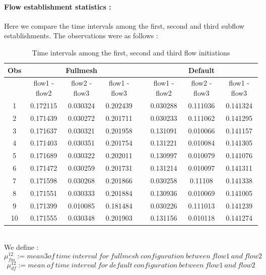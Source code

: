 \documentclass[a4paper,11pt]{article}
\begin{document}
			\clearpage
			\paragraph{Flow establishment statistics :}
			\label{subsubsubsec:flowestablish}
			Here we compare the time intervals among the first, second and third subflow establishments. The observations were as follows :
			\begin{table}[h!]
				
				
				\centering
				\begin{tabular}{|c|c|c|c|c|c|c|c|}
					\hline
					Obs & \multicolumn{3}{|c|}{Fullmesh} &  & \multicolumn{3}{|c|}{Default} \\
					\hline
					\hline
					& flow1 - flow2 & flow2 - flow3 & flow1 - flow3 & & flow1 - flow2 & flow2 - flow3 & flow1 - flow3 \\
					\hline
					\hline
					1 & 0.172115 & 0.030324 & 0.202439 & & 0.030288 & 0.111036 & 0.141324 \\
					\hline
					2 & 0.171439 & 0.030272 & 0.201711 & & 0.030233 & 0.111062 & 0.141295 \\
					\hline
					3 & 0.171637 & 0.030321 & 0.201958 & & 0.131091 & 0.010066 & 0.141157 \\
					\hline
					4 & 0.171403 & 0.030351 & 0.201754 & & 0.131221 & 0.010084 & 0.141305 \\
					\hline
					5 & 0.171689 & 0.030322 & 0.202011 & & 0.130997 & 0.010079 & 0.141076 \\
					\hline
					6 & 0.171472 & 0.030259 & 0.201731 & & 0.131214 & 0.010097 & 0.141311 \\
					\hline
					7 & 0.171598 & 0.030268 & 0.201866 & & 0.030258 & 0.11108 & 0.141338 \\
					\hline
					8 & 0.171551 & 0.030333 & 0.201884 & & 0.130936 & 0.010069 & 0.141005 \\
					\hline
					9 & 0.171399 & 0.010085 & 0.181484 & & 0.030226 & 0.111013 & 0.141239 \\
					\hline
					10 & 0.171555 & 0.030348 & 0.201903 & & 0.131156 & 0.010118 & 0.141274 \\
					\hline
				\end{tabular}
				\caption{Time intervals among the first, second and third flow initiations}
			\end{table} \\
			\iffalse
			We define :
			$$\mu_{fm}^{12} := mean3 of\ time\ interval\ for\ fullmesh\ configuration\ between\ flow1\ and\ flow2$$ 
			$$\mu_{df}^{12} := mean\ of\ time\ interval\ for\ default\ configuration\ between\ flow1\ and\ flow2$$
\end{document}
